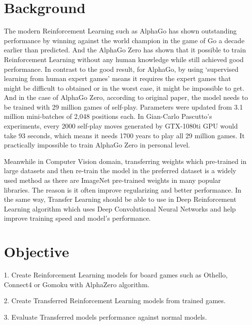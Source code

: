\documentclass[12pt,a4paper]{report}
\begin{document}
\section{Background}
{
\hspace{0.6cm}The modern Reinforcement Learning such as AlphaGo\cite{AlphaGo} has shown outstanding performance by winning against the world champion in the game of Go a decade earlier than predicted\cite{GovsCom}\cite{AGWeb}. And the AlphaGo Zero\cite{AlphaGoZero} has shown that it possible to train Reinforcement Learning without any human knowledge while still achieved good performance\cite{AlphaGoZero}\cite{AlphaZero}. In contrast to the good result, for AlphaGo, by using ‘supervised learning from human expert games’\cite{AlphaGo} means it requires the expert games that might be difficult to obtained or in the worst case, it might be impossible to get. And in the case of AlphaGo Zero, according to original paper\cite{AlphaGoZero}, the model needs to be trained with 29 million games of self-play. Parameters were updated from 3.1 million mini-batches of 2,048 positions each. In Gian-Carlo Pascutto's experiments, every 2000 self-play moves generated by GTX-1080ti GPU would take 93 seconds, which means it needs 1700 years to play all 29 million games\cite{GCP}. It practically impossible to train AlphaGo Zero in personal level.\par
\hspace{0cm} Meanwhile in Computer Vision domain, transferring weights which pre-trained in large datasets and then re-train the model in the preferred dataset is a widely used method as there are ImageNet\cite{Imagenet} pre-trained weights in many popular libraries\cite{TFpaper}\cite{Pytorch}\cite{Keras}. The reason is it often improve regularizing and better performance\cite{Transferable}. In the same way, Transfer Learning should be able to use in Deep Reinforcement Learning algorithm which uses Deep Convolutional Neural Networks and help improve training speed and model's performance.\par
}
\section{Objective}
{
\hspace{0.6cm} 1. Create Reinforcement Learning models for board games such as Othello, Connect4 or Gomoku with AlphaZero algorithm.\par
\hspace{0cm} 2. Create Transferred Reinforcement Learning models from trained games.\par
\hspace{0cm} 3. Evaluate Transferred models performance against normal models.\par
}
\end{document}
